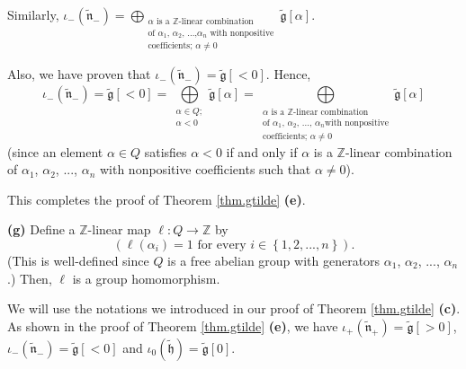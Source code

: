 \documentclass[etingof-lie.tex]{subfiles}
\begin{document}
\begin{vershort}
Similarly, $\iota_{-}\left(  \widetilde{\mathfrak{n}}_{-}\right)
=\bigoplus\limits_{\substack{\alpha\text{ is a }\mathbb{Z}\text{-linear
combination}\\\text{of }\alpha_{1}\text{, }\alpha_{2}\text{, }...\text{,
}\alpha_{n}\text{ with nonpositive}\\\text{coefficients; }\alpha\neq
0}}\widetilde{\mathfrak{g}}\left[  \alpha\right]  $.
\end{vershort}

\begin{verlong}
Also, we have proven that $\iota_{-}\left(  \widetilde{\mathfrak{n}}%
_{-}\right)  =\widetilde{\mathfrak{g}}\left[  <0\right]  $. Hence,%
\[
\iota_{-}\left(  \widetilde{\mathfrak{n}}_{-}\right)  =\widetilde{\mathfrak{g}%
}\left[  <0\right]  =\bigoplus\limits_{\substack{\alpha\in Q;\\\alpha
<0}}\widetilde{\mathfrak{g}}\left[  \alpha\right]  =\bigoplus
\limits_{\substack{\alpha\text{ is a }\mathbb{Z}\text{-linear combination}%
\\\text{of }\alpha_{1}\text{, }\alpha_{2}\text{, }...\text{, }\alpha_{n}\text{
with nonpositive}\\\text{coefficients; }\alpha\neq0}}\widetilde{\mathfrak{g}%
}\left[  \alpha\right]
\]
(since an element $\alpha\in Q$ satisfies $\alpha<0$ if and only if $\alpha$
is a $\mathbb{Z}$-linear combination of $\alpha_{1}$, $\alpha_{2}$, $...$,
$\alpha_{n}$ with nonpositive coefficients such that $\alpha\neq0$).
\end{verlong}

This completes the proof of Theorem \ref{thm.gtilde} \textbf{(e)}.

\bigskip

\textbf{(g)} Define a $\mathbb{Z}$-linear map $\ell:Q\rightarrow\mathbb{Z}$ by%
\[
\left(  \ell\left(  \alpha_{i}\right)  =1\text{ for every }i\in\left\{
1,2,...,n\right\}  \right)  .
\]
(This is well-defined since $Q$ is a free abelian group with generators
$\alpha_{1}$, $\alpha_{2}$, $...$, $\alpha_{n}$.) Then, $\ell$ is a group homomorphism.

We will use the notations we introduced in our proof of Theorem
\ref{thm.gtilde} \textbf{(c)}. As shown in the proof of Theorem
\ref{thm.gtilde} \textbf{(e)}, we have $\iota_{+}\left(
\widetilde{\mathfrak{n}}_{+}\right)  =\widetilde{\mathfrak{g}}\left[
>0\right]  $, $\iota_{-}\left(  \widetilde{\mathfrak{n}}_{-}\right)
=\widetilde{\mathfrak{g}}\left[  <0\right]  $ and $\iota_{0}\left(
\widetilde{\mathfrak{h}}\right)  =\widetilde{\mathfrak{g}}\left[  0\right]  $.
\end{document}
